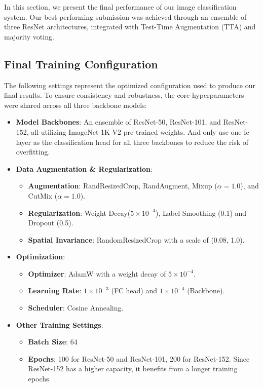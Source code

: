\documentclass[a4paper, twocolumn]{article} %
\begin{document}
In this section, we present the final performance of our image classification system. Our best-performing submission was achieved through an ensemble of three ResNet architectures, integrated with Test-Time Augmentation (TTA) and majority voting.

\subsection{Final Training Configuration}
The following settings represent the optimized configuration used to produce our final results. To ensure consistency and robustness, the core hyperparameters were shared across all three backbone models:

\begin{itemize}
    \item \textbf{Model Backbones}: An ensemble of ResNet-50, ResNet-101, and ResNet-152, all utilizing ImageNet-1K V2 pre-trained weights. And only use one fc layer as the classification head for all three backbones to reduce the risk of overfitting.
    \item \textbf{Data Augmentation \& Regularization}:
    \begin{itemize}
        \item \textbf{Augmentation}: RandResizedCrop, RandAugment, Mixup ($\alpha=1.0$), and CutMix ($\alpha=1.0$).
        \item \textbf{Regularization}: Weight Decay($5 \times 10^{-4}$), Label Smoothing (0.1) and Dropout (0.5).
        \item \textbf{Spatial Invariance}: RandomResizedCrop with a scale of (0.08, 1.0).
    \end{itemize}
    \item \textbf{Optimization}:
    \begin{itemize}
        \item \textbf{Optimizer}: AdamW with a weight decay of $5 \times 10^{-4}$.
        \item \textbf{Learning Rate}: $1 \times 10^{-3}$ (FC head) and $1 \times 10^{-4}$ (Backbone).
        \item \textbf{Scheduler}: Cosine Annealing.
    \end{itemize}
    \item \textbf{Other Training Settings}:
    \begin{itemize}
        \item \textbf{Batch Size}: 64
        \item \textbf{Epochs}: 100 for ResNet-50 and ResNet-101, 200 for ResNet-152. Since ResNet-152 has a higher capacity, it benefits from a longer training epochs.

\end{itemize}
\end{itemize}
\end{document}

